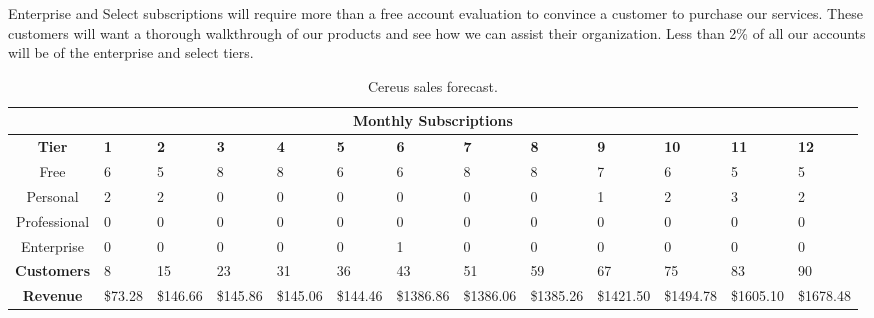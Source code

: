 Enterprise and Select subscriptions will require more than a free account evaluation to convince a customer to purchase our services. These customers will want a thorough walkthrough of our products and see how we can assist their organization. Less than 2\% of all our accounts will be of the enterprise and select tiers.


\begin{sidewaystable}
\begin{table}[H]
  \centering
  \setlength\tabcolsep{5pt}
  \def\arraystretch{1.2}%

  \begin{tabularx}{\textwidth}{X X X X X X X X X X X X X}

    \multicolumn{13}{c}{\textbf{Monthly Subscriptions}} \\

    \hline
    
    \multicolumn{1}{c|}{\textbf{Tier}} & \textbf{1} & \textbf{2} & \textbf{3} & \textbf{4} & \textbf{5} & \textbf{6} & \textbf{7} & \textbf{8} & \textbf{9} & \textbf{10} & \textbf{11} & \textbf{12}  \\

    \hline

    \multicolumn{1}{c|}{Free} & 6 & 5 & 8 & 8 & 6 & 6 & 8 & 8 & 7 & 6 & 5 & 5  \\

    \multicolumn{1}{c|}{Personal} & 2 & 2 & 0 & 0 & 0 & 0 & 0 & 0 & 1 & 2 & 3 & 2  \\

    \multicolumn{1}{c|}{Professional} & 0 & 0 & 0 & 0 & 0 & 0 & 0 & 0 & 0 & 0 & 0 & 0  \\

    \multicolumn{1}{c|}{Enterprise} & 0 & 0 & 0 & 0 & 0 & 1 & 0 & 0 & 0 & 0 & 0 & 0  \\

    \hline

    \multicolumn{1}{c|}{\textbf{Customers}} & 8 & 15 & 23 & 31 & 36 & 43 & 51 & 59 & 67 & 75 & 83 & 90  \\

    \hline

    \multicolumn{1}{c|}{\textbf{Revenue}} & \$73.28 & \$146.66 & \$145.86 & \$145.06 & \$144.46 & \$1386.86 & \$1386.06  & \$1385.26 & \$1421.50 & \$1494.78 & \$1605.10 & \$1678.48  \\

  \end{tabularx}
  \caption{Cereus sales forecast.}
  \label{table.sales.forecast}
\end{table}
\end{sidewaystable}

